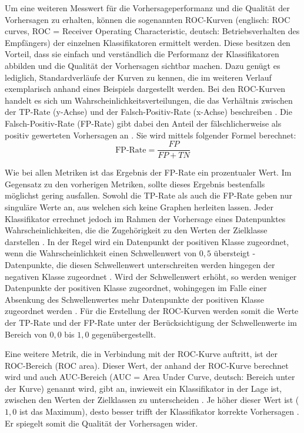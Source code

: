 \label{roc-def}
Um eine weiteren Messwert für die Vorhersageperformanz und die Qualität der Vorhersagen zu erhalten, können die sogenannten ROC-Kurven (englisch: ROC curves, ROC = Receiver Operating Characteristic, deutsch: Betriebsverhalten des Empfängers) der einzelnen Klassifikatoren ermittelt werden. Diese besitzen den Vorteil, dass sie einfach und verständlich die Performanz der Klassifikatoren abbilden und die Qualität der Vorhersagen \glqq sichtbar\grqq{} machen. Dazu genügt es lediglich, Standardverläufe der Kurven zu kennen, die im weiteren Verlauf exemplarisch anhand eines Beispiels dargestellt werden.
Bei den ROC-Kurven handelt es sich um Wahrscheinlichkeitsverteilungen, die das Verhältnis zwischen der TP-Rate (y-Achse) und der Falsch-Positiv-Rate (x-Achse) beschreiben \cite{Sammut2017,Narkhede2018}. Die Falsch-Positiv-Rate (FP-Rate) gibt dabei den Anteil der fälschlicherweise als positiv gewerteten Vorhersagen an \cite{Alpaydin2010}. Sie wird mittels folgender Formel berechnet:
\\\[\text{FP-Rate} = \frac{FP}{FP+TN}\]

Wie bei allen Metriken ist das Ergebnis der FP-Rate ein prozentualer Wert. Im Gegensatz zu den vorherigen Metriken, sollte dieses Ergebnis bestenfalls möglichst gering ausfallen. Sowohl die TP-Rate als auch die FP-Rate geben nur singuläre Werte an, aus welchen sich keine Graphen herleiten lassen. Jeder Klassifikator errechnet jedoch im Rahmen der Vorhersage eines Datenpunktes Wahrscheinlichkeiten, die die Zugehörigkeit zu den Werten der Zielklasse darstellen \cite{KNIMETV2019}. In der Regel wird ein Datenpunkt der positiven Klasse zugeordnet, wenn die Wahrscheinlichkeit einen Schwellenwert von $0,5$ übersteigt - Datenpunkte, die diesen Schwellenwert unterschreiten werden hingegen der negativen Klasse zugeordnet \cite{KNIMETV2019}. Wird der Schwellenwert erhöht, so werden weniger Datenpunkte der positiven Klasse zugeordnet, wohingegen im Falle einer Absenkung des Schwellenwertes mehr Datenpunkte der positiven Klasse zugeordnet werden \cite{KNIMETV2019}. Für die Erstellung der ROC-Kurven werden somit die Werte der TP-Rate und der FP-Rate unter der Berücksichtigung der Schwellenwerte im Bereich von $0,0$ bis $1,0$ gegenübergestellt.

Eine weitere Metrik, die in Verbindung mit der ROC-Kurve auftritt, ist der ROC-Bereich (ROC area). Dieser Wert, der anhand der ROC-Kurve berechnet wird und auch AUC-Bereich (AUC = Area Under Curve, deutsch: Bereich unter der Kurve) genannt wird, gibt an, inwieweit ein Klassifikator in der Lage ist, zwischen den Werten der Zielklassen zu unterscheiden \cite{Narkhede2018}. Je höher dieser Wert ist ($1,0$ ist das Maximum), desto besser trifft der Klassifikator korrekte Vorhersagen \cite{Narkhede2018}. Er spiegelt somit die Qualität der Vorhersagen wider.

